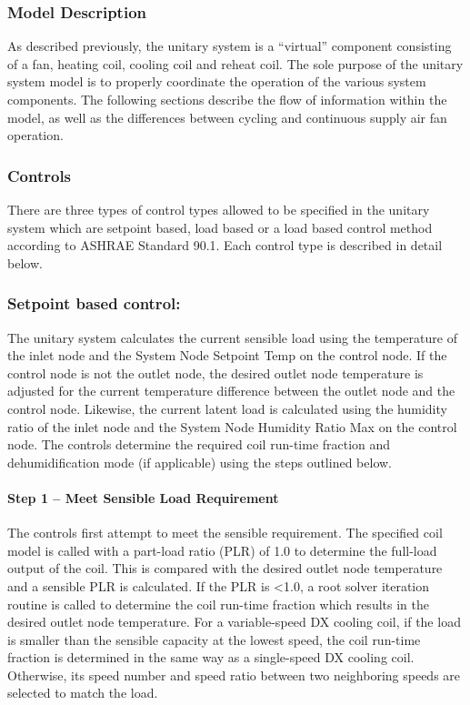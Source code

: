 \subsubsection{Model Description}\label{model-description}

As described previously, the unitary system is a ``virtual'' component consisting of a fan, heating coil, cooling coil and reheat coil. The sole purpose of the unitary system model is to properly coordinate the operation of the various system components. The following sections describe the flow of information within the model, as well as the differences between cycling and continuous supply air fan operation.

\subsubsection{Controls}\label{controls}

There are three types of control types allowed to be specified in the unitary system which are setpoint based, load based or a load based control method according to ASHRAE Standard 90.1. Each control type is described in detail below.

\subsubsection{Setpoint based control:}\label{setpoint-based-control}

The unitary system calculates the current sensible load using the temperature of the inlet node and the System Node Setpoint Temp on the control node. If the control node is not the outlet node, the desired outlet node temperature is adjusted for the current temperature difference between the outlet node and the control node. Likewise, the current latent load is calculated using the humidity ratio of the inlet node and the System Node Humidity Ratio Max on the control node. The controls determine the required coil run-time fraction and dehumidification mode (if applicable) using the steps outlined below.

\paragraph{Step 1 -- Meet Sensible Load Requirement}\label{step-1-meet-sensible-load-requirement}

The controls first attempt to meet the sensible requirement. The specified coil model is called with a part-load ratio (PLR) of 1.0 to determine the full-load output of the coil. This is compared with the desired outlet node temperature and a sensible PLR is calculated. If the PLR is \textless{}1.0, a root solver iteration routine is called to determine the coil run-time fraction which results in the desired outlet node temperature. For a variable-speed DX cooling coil, if the load is smaller than the sensible capacity at the lowest speed, the coil run-time fraction is determined in the same way as a single-speed DX cooling coil. Otherwise, its speed number and speed ratio between two neighboring speeds are selected to match the load.

